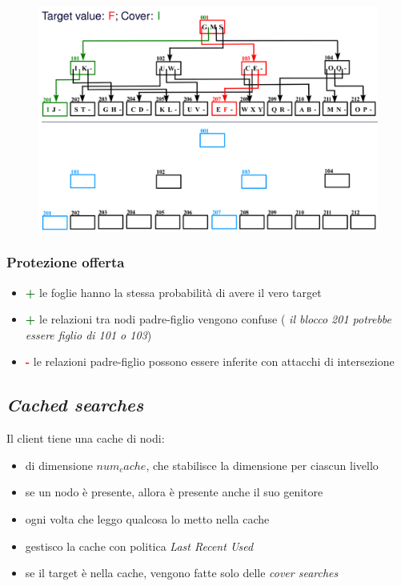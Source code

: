\documentclass{report}
\begin{document}
\begin{figure}[ht]
    \centering
    \includegraphics[width=1\linewidth]{images/cover-searches.png}
\end{figure}

\subsubsection{Protezione offerta}
\begin{itemize}
    \item \textcolor{darkgreen}{\textbf{+}} le foglie hanno la stessa probabilità 
    di avere il vero target 
    \item \textcolor{darkgreen}{\textbf{+}} le relazioni tra nodi padre-figlio vengono confuse (\textit{
    il blocco 201 potrebbe essere figlio di 101 o 103})
    \item \textcolor{red}{\textbf{-}} le relazioni padre-figlio possono essere inferite con attacchi di intersezione
\end{itemize}

\subsection{\textit{Cached searches}}
Il client tiene una cache di nodi:
\begin{itemize}
    \item di dimensione $num_cache$, che stabilisce la dimensione per ciascun livello 
    \item se un nodo è presente, allora è presente anche il suo genitore
    \item ogni volta che leggo qualcosa lo metto nella cache 
    \item gestisco la cache con politica \textit{Last Recent Used}
    \item se il target è nella cache, vengono fatte solo delle \textit{cover searches}
\end{itemize}
\end{document}
